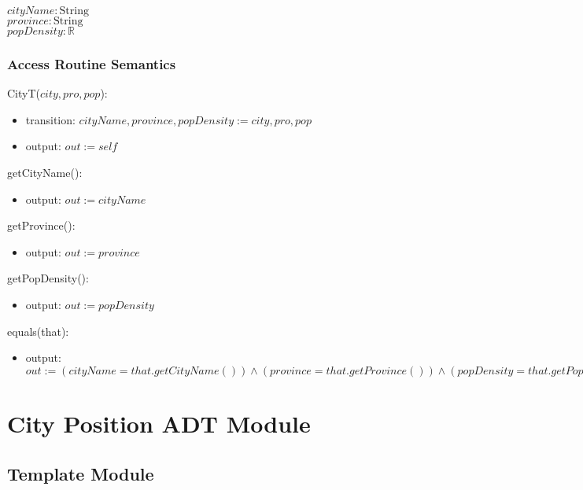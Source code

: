 \documentclass[12pt]{article}
\begin{document}
$\mathit{cityName}: \text{String}$\\
$\mathit{province}: \text{String}$\\
$\mathit{popDensity}: \mathbb{R}$


\subsubsection* {Access Routine Semantics}

CityT($city, pro, pop$):
\begin{itemize}
\item transition: $cityName, province, popDensity := city, pro, pop$ 

\item output: $\mathit{out} := \mathit{self}$
\end{itemize}


\noindent getCityName():
\begin{itemize}
\item output: $\mathit{out} := cityName$ 
\end{itemize}

\noindent getProvince():
\begin{itemize}
\item output: $\mathit{out} := province$
\end{itemize}

\noindent getPopDensity():
\begin{itemize}
\item output: $\mathit{out} := popDensity$
\end{itemize}


\noindent equals(that):
\begin{itemize}
\item output: $\mathit{out} := (cityName = that.getCityName()) \land (province = that.getProvince()) \land (popDensity = that.getPopDensity())$
\end{itemize}





\newpage

\section* {City Position ADT Module}

\subsection* {Template Module}
\end{document}
